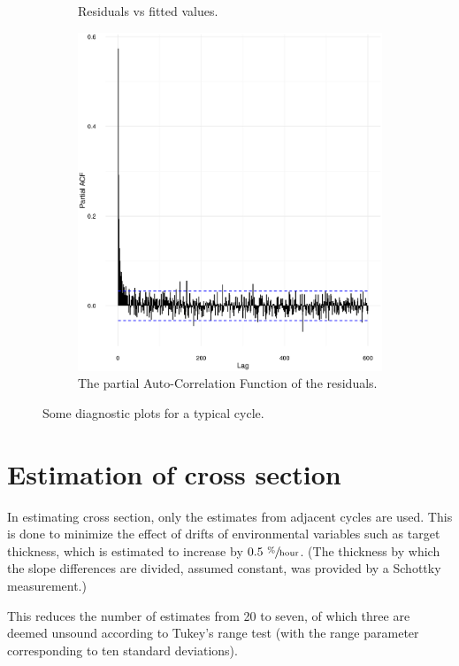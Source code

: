 \documentclass[reprint]{revtex4-1}
\newcommand{\scl}{.4}
\begin{document}
\begin{figure}
\begin{subfigure}{.5\textwidth}
\caption{Residuals vs fitted values.}
\end{subfigure}
\begin{subfigure}{.5\textwidth}
\includegraphics[scale=\scl]{img/Run969_residual_PACF.eps}
\caption{The partial Auto-Correlation Function of the residuals.}
\end{subfigure}
\caption{Some diagnostic plots for a typical cycle.\label{fig:Run969}}
\end{figure}

\section{Estimation of cross section}

In estimating cross section, only the estimates from adjacent cycles are used. This is done to minimize the effect of drifts of environmental variables such as target thickness, which is estimated to increase by $0.5~ \sfrac{\%}{\mathrm{hour}}$. (The thickness by which the slope differences are divided, assumed constant, was provided by a Schottky measurement.)

This reduces the number of estimates from 20 to seven, of which three are deemed unsound according to Tukey's range test (with the range parameter corresponding to ten standard deviations). 
\end{document}
